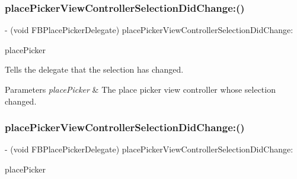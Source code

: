 \subsubsection{\texorpdfstring{place\+Picker\+View\+Controller\+Selection\+Did\+Change\+:()}{placePickerViewControllerSelectionDidChange:()}\hspace{0.1cm}{\footnotesize\ttfamily [3/5]}}
{\footnotesize\ttfamily -\/ (void F\+B\+Place\+Picker\+Delegate) place\+Picker\+View\+Controller\+Selection\+Did\+Change\+: \begin{DoxyParamCaption}\item[{(\hyperlink{interfaceFBPlacePickerViewController}{F\+B\+Place\+Picker\+View\+Controller} $\ast$)}]{place\+Picker }\end{DoxyParamCaption}\hspace{0.3cm}{\ttfamily [optional]}}

Tells the delegate that the selection has changed.


\begin{DoxyParams}{Parameters}
{\em place\+Picker} & The place picker view controller whose selection changed. \\
\hline
\end{DoxyParams}
\mbox{\label{protocolFBPlacePickerDelegate_01-p_a45f5c05ae6b3d030c4350562954964db}} 
\subsubsection{\texorpdfstring{place\+Picker\+View\+Controller\+Selection\+Did\+Change\+:()}{placePickerViewControllerSelectionDidChange:()}\hspace{0.1cm}{\footnotesize\ttfamily [4/5]}}
{\footnotesize\ttfamily -\/ (void F\+B\+Place\+Picker\+Delegate) place\+Picker\+View\+Controller\+Selection\+Did\+Change\+: \begin{DoxyParamCaption}\item[{(\hyperlink{interfaceFBPlacePickerViewController}{F\+B\+Place\+Picker\+View\+Controller} $\ast$)}]{place\+Picker }\end{DoxyParamCaption}\hspace{0.3cm}{\ttfamily [optional]}}

